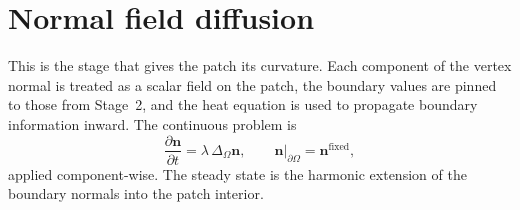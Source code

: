 \section{Normal field diffusion}

This is the stage that gives the patch its curvature. Each component of the vertex normal is treated as a scalar field on the patch, the boundary values are pinned to those from Stage~2, and the heat equation is used to propagate boundary information inward. The continuous problem is
\begin{equation}
\frac{\partial \mathbf{n}}{\partial t} = \lambda \, \Delta_\Omega \mathbf{n}, \qquad \mathbf{n}\big|_{\partial\Omega} = \mathbf{n}^{\text{fixed}},
\end{equation}
applied component-wise. The steady state is the harmonic extension of the boundary normals into the patch interior.

